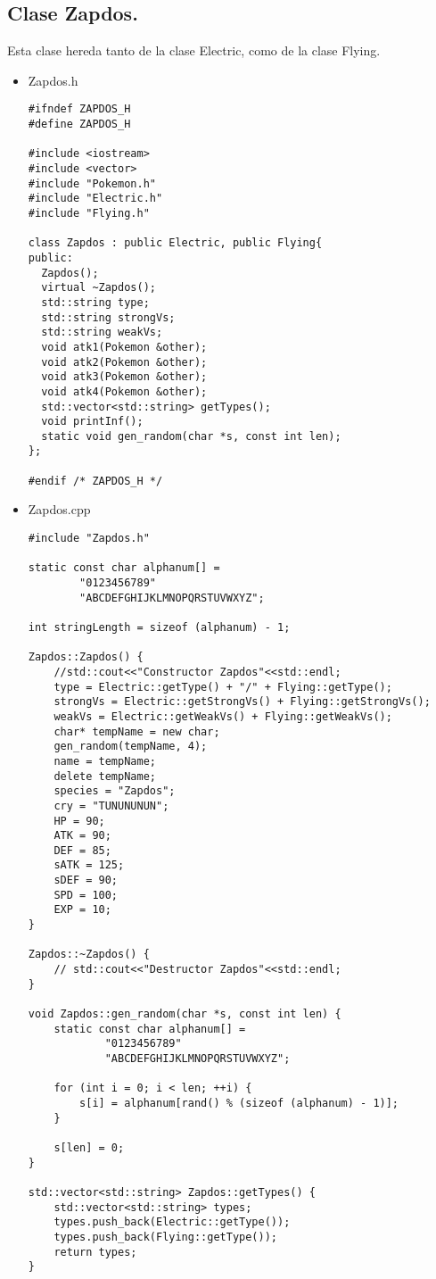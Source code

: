 \documentclass[11pt]{article}
\begin{document}
\subsection{ Clase Zapdos.}
Esta clase hereda tanto de la clase Electric, como de la clase Flying.
\begin{itemize}
\item Zapdos.h
\begin{lstlisting}
#ifndef ZAPDOS_H
#define ZAPDOS_H

#include <iostream>
#include <vector>
#include "Pokemon.h"
#include "Electric.h"
#include "Flying.h"

class Zapdos : public Electric, public Flying{
public:
  Zapdos();
  virtual ~Zapdos();
  std::string type;
  std::string strongVs;
  std::string weakVs;
  void atk1(Pokemon &other);
  void atk2(Pokemon &other);
  void atk3(Pokemon &other);
  void atk4(Pokemon &other);
  std::vector<std::string> getTypes();
  void printInf();
  static void gen_random(char *s, const int len);
};

#endif /* ZAPDOS_H */
\end{lstlisting}
\item Zapdos.cpp
\begin{lstlisting}
#include "Zapdos.h"

static const char alphanum[] =
        "0123456789"
        "ABCDEFGHIJKLMNOPQRSTUVWXYZ";

int stringLength = sizeof (alphanum) - 1;

Zapdos::Zapdos() {
    //std::cout<<"Constructor Zapdos"<<std::endl;
    type = Electric::getType() + "/" + Flying::getType();
    strongVs = Electric::getStrongVs() + Flying::getStrongVs();
    weakVs = Electric::getWeakVs() + Flying::getWeakVs();
    char* tempName = new char;
    gen_random(tempName, 4);
    name = tempName;
    delete tempName;
    species = "Zapdos";
    cry = "TUNUNUNUN";
    HP = 90;
    ATK = 90;
    DEF = 85;
    sATK = 125;
    sDEF = 90;
    SPD = 100;
    EXP = 10;
}

Zapdos::~Zapdos() {
    // std::cout<<"Destructor Zapdos"<<std::endl;
}

void Zapdos::gen_random(char *s, const int len) {
    static const char alphanum[] =
            "0123456789"
            "ABCDEFGHIJKLMNOPQRSTUVWXYZ";

    for (int i = 0; i < len; ++i) {
        s[i] = alphanum[rand() % (sizeof (alphanum) - 1)];
    }

    s[len] = 0;
}

std::vector<std::string> Zapdos::getTypes() {
    std::vector<std::string> types;
    types.push_back(Electric::getType());
    types.push_back(Flying::getType());
    return types;
}


\end{lstlisting}
\end{itemize}
\end{document}
